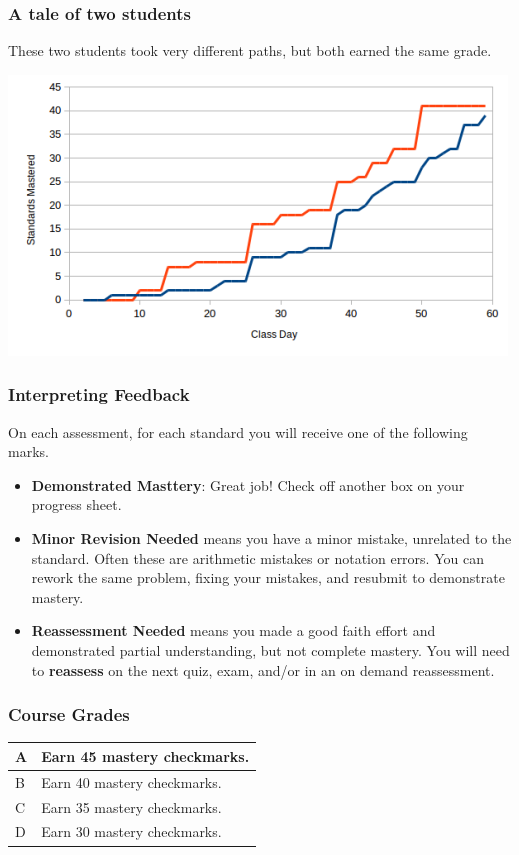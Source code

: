 \documentclass[aspectration=1610]{beamer}
\begin{document}
\begin{frame}\frametitle{A tale of two students}
These two students took very different paths, but both earned the same grade.
\begin{center}
\includegraphics[scale=0.7]{student-comparison.png}
\end{center}
\end{frame}



\begin{frame}\frametitle{Interpreting Feedback}
On each assessment, for each standard you will receive one of the following marks.
\begin{itemize}
\item {\bf Demonstrated Masttery}: Great job!  Check off another box on your progress sheet.
\item {\bf Minor Revision Needed} means you have a minor mistake, unrelated to the standard. Often these are arithmetic mistakes or notation errors. You can rework the same problem, fixing your mistakes, and resubmit to demonstrate mastery.
\item {\bf Reassessment Needed} means you made a good faith effort and demonstrated
      partial understanding, but not complete mastery. You will need to \textbf{reassess} on the next quiz, exam, and/or in an on demand reassessment.
\end{itemize}

\vspace{0.2in}

\end{frame}




\begin{frame}\frametitle{Course Grades}

\begin{center}
\begin{tabular}{ll} \hline
A & Earn 45 mastery checkmarks.\\ \hline
B & Earn 40 mastery checkmarks. \\ \hline
C & Earn 35 mastery checkmarks.\\ \hline
D & Earn 30 mastery checkmarks. \\ \hline
\end{tabular}
\end{center}

\end{frame}
\end{document}
